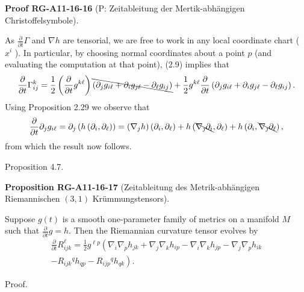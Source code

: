 \documentclass[10pt, letterpaper]{article}
\newcommand{\CustomHeading}[3]{%
  \par\medskip\noindent%
  \textbf{#1 #2} \textnormal{(#3)}.\enskip%
}
\newenvironment{PROP}[2]{\begin{unitbox}\CustomHeading{Proposition}{#1}{#2}}{\end{unitbox}}
\newenvironment{PROOF}[2]{\begin{unitbox}\CustomHeading{Proof}{#1}{#2}}{\end{unitbox}}
\begin{document}
\begin{PROOF}{RG-A11-16-16}{P: Zeitableitung der Mertik-abhängigen Christoffelsymbole}
As $\frac{\partial}{\partial t} \Gamma$ and $\nabla h$ are tensorial, we are free to work in any local coordinate chart ( $x^{i}$ ). In particular, by choosing normal coordinates about a point $p$ (and evaluating the computation at that point), (2.9) implies that
$$
\frac{\partial}{\partial t} \Gamma_{i j}^{k}=\frac{1}{2}\left(\frac{\partial}{\partial t} g^{k \ell}\right) \bcancel{\left(\partial_{j} g_{i \ell}+\partial_{i} g_{j \ell}-\partial_{\ell} g_{i j}\right)}+\frac{1}{2} g^{k \ell} \frac{\partial}{\partial t}\left(\partial_{j} g_{i \ell}+\partial_{i} g_{j \ell}-\partial_{\ell} g_{i j}\right) .
$$
Using Proposition 2.29 we observe that
$$
\frac{\partial}{\partial t} \partial_{j} g_{i \ell}=\partial_{j}\left(h\left(\partial_{i}, \partial_{\ell}\right)\right)
=\left(\nabla_{j} h\right)\left(\partial_{i}, \partial_{\ell}\right)+h\left(\bcancel{\nabla_{\jmath} \partial_{i}}, \partial_{\ell}\right)+h\left(\partial_{i}, \bcancel{\nabla_{\jmath} \partial_{\ell}}\right),
$$
from which the result now follows.
\end{PROOF}



Proposition 4.7. 

\begin{PROP}{RG-A11-16-17}{Zeitableitung des Metrik-abhängigen Riemannischen $(3,1)$ Krümmungstensors}
Suppose $g(t)$ is a smooth one-parameter family of metrics on a manifold $M$ such that $\frac{\partial}{\partial t} g=h$. Then the Riemannian curvature tensor evolves by
$$
\begin{gathered}
\frac{\partial}{\partial t} R_{i j k}^{\ell}=\frac{1}{2} g^{\ell p}\left(\nabla_{i} \nabla_{p} h_{j k}+\nabla_{j} \nabla_{k} h_{i p}-\nabla_{i} \nabla_{k} h_{j p}-\nabla_{j} \nabla_{p} h_{i k}\right. \\
\left.-R_{i j k}{ }^{q} h_{q p}-R_{i j p}{ }^{q} h_{q k}\right) .
\end{gathered}
$$
\end{PROP}

Proof. 
\end{document}

